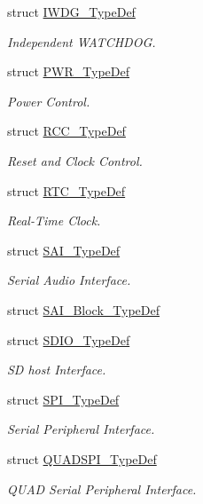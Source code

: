 \begin{DoxyCompactItemize}
struct \mbox{\hyperlink{struct_i_w_d_g___type_def}{I\+W\+D\+G\+\_\+\+Type\+Def}}
\begin{DoxyCompactList}\small\item\em Independent W\+A\+T\+C\+H\+D\+OG. \end{DoxyCompactList}\item 
struct \mbox{\hyperlink{struct_p_w_r___type_def}{P\+W\+R\+\_\+\+Type\+Def}}
\begin{DoxyCompactList}\small\item\em Power Control. \end{DoxyCompactList}\item 
struct \mbox{\hyperlink{struct_r_c_c___type_def}{R\+C\+C\+\_\+\+Type\+Def}}
\begin{DoxyCompactList}\small\item\em Reset and Clock Control. \end{DoxyCompactList}\item 
struct \mbox{\hyperlink{struct_r_t_c___type_def}{R\+T\+C\+\_\+\+Type\+Def}}
\begin{DoxyCompactList}\small\item\em Real-\/\+Time Clock. \end{DoxyCompactList}\item 
struct \mbox{\hyperlink{struct_s_a_i___type_def}{S\+A\+I\+\_\+\+Type\+Def}}
\begin{DoxyCompactList}\small\item\em Serial Audio Interface. \end{DoxyCompactList}\item 
struct \mbox{\hyperlink{struct_s_a_i___block___type_def}{S\+A\+I\+\_\+\+Block\+\_\+\+Type\+Def}}
\item 
struct \mbox{\hyperlink{struct_s_d_i_o___type_def}{S\+D\+I\+O\+\_\+\+Type\+Def}}
\begin{DoxyCompactList}\small\item\em SD host Interface. \end{DoxyCompactList}\item 
struct \mbox{\hyperlink{struct_s_p_i___type_def}{S\+P\+I\+\_\+\+Type\+Def}}
\begin{DoxyCompactList}\small\item\em Serial Peripheral Interface. \end{DoxyCompactList}\item 
struct \mbox{\hyperlink{struct_q_u_a_d_s_p_i___type_def}{Q\+U\+A\+D\+S\+P\+I\+\_\+\+Type\+Def}}
\begin{DoxyCompactList}\small\item\em Q\+U\+AD Serial Peripheral Interface. \end{DoxyCompactList}\item 

\end{DoxyCompactItemize}
